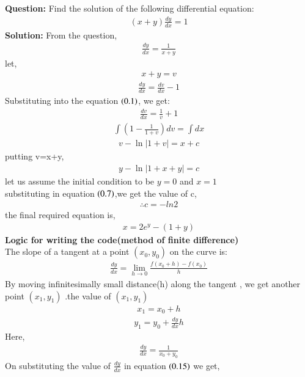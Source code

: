 \documentclass[journal]{IEEEtran}
\begin{document}
\textbf{Question:}  
Find the solution of the following differential equation:  
\begin{align*}
    (x + y) \frac{dy}{dx} = 1
\end{align*}
\textbf{Solution:}  
From the question, 
\begin{align}
\frac{dy}{dx}=\frac{1}{x+y}
\end{align}
let,
\begin{align}
    x+y=v
\end{align}
\begin{align}
    \frac{dy}{dx}=\frac{dv}{dx}-1
\end{align}
Substituting into the equation $\left(0.1\right)$, we get:
\begin{align}
    \frac{dv}{dx} = \frac{1}{v} + 1
\end{align}
\begin{align}
    \int(1- \frac{1}{1+v})dv = \int{dx}
\end{align}
\begin{align}
v-\ln |1+v|=x+c
\end{align}
putting v=x+y,
\begin{align}
    y-\ln|1+x+y|=c
\end{align}
let us assume  the initial condition to be $y=0$ and $x=1$\\
substituting in equation $\left(0.7\right)$,we get the value of c,
\begin{align}
\therefore c={-ln{2}}
\end{align}
the final required equation is,
\begin{align}
    x={2e^{y}-(1+y)}
\end{align}
\textbf{Logic for writing the code(method of finite difference)}
\\
The slope of a tangent at a point $(x_0, y_0)$ on the curve is: 
\begin{align} 
\frac{dy}{dx} = \lim_{h \to 0} \frac{f(x_0 + h) - f(x_0)}{h}
\end{align}
By moving infinitesimally small distance(h) along the tangent , we get another point $(x_1, y_1)$ .the value of $(x_1,y_1)$
\begin{align}
x_1=x_0+h
\end{align}
\begin{align}
y_1=y_0+\frac{dy}{dx}h
\end{align}
Here,
\begin{align}
    \frac{dy}{dx}=\frac{1}{x_0+y_0}
\end{align}
On substituting the value of $\frac{dy}{dx}$ in equation $\left(0.15\right)$ we get,
\end{document}
